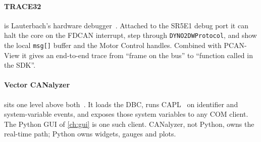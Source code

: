 \paragraph{TRACE32} is Lauterbach's hardware debugger~\cite{trace32}.
Attached to the SR5E1 debug port it can halt the core on the FDCAN
interrupt, step through \texttt{DYNO2DWProtocol}, and show the local
\texttt{msg[]} buffer and the Motor Control handles. Combined with PCAN-View
it gives an end-to-end trace from ``frame on the bus'' to ``function
called in the SDK''.

\paragraph{Vector CANalyzer} sits one level above both~\cite{vectorcanalyzer}.
It loads the DBC, runs CAPL~\cite{vectorcapl} on identifier and system-variable
events, and exposes those system variables to any COM client. The Python GUI
of \cref{ch:gui} is one such client. CANalyzer, not Python, owns the
real-time path; Python owns widgets, gauges and plots.
